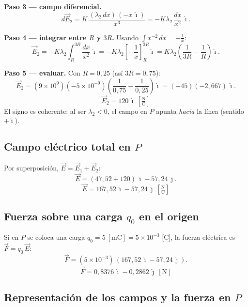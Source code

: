 \documentclass[12pt,letterpaper]{article}
\newcommand{\ii}{\hat{\imath}}
\newcommand{\jj}{\hat{\jmath}}
\begin{document}
\noindent\textbf{Paso 3 — campo diferencial.}
\[
    d\vec{E}_2 = K\,\frac{(\lambda_2\,dx)\,(-x\,\ii)}{x^{3}}
    = -K\lambda_2\,\frac{dx}{x^{2}}\,\ii.
\]

\noindent\textbf{Paso 4 — integrar entre $R$ y $3R$.} Usando $\displaystyle\int x^{-2}\,dx = -\frac{1}{x}$:
\[
    \vec{E}_2 = -K\lambda_2\int_{R}^{3R}\frac{dx}{x^{2}}\,\ii
    = -K\lambda_2\left[-\frac{1}{x}\right]_{R}^{3R}\ii
    = K\lambda_2\left(\frac{1}{3R} - \frac{1}{R}\right)\ii.
\]

\noindent\textbf{Paso 5 — evaluar.} Con $R = 0{,}25$ (as\'i $3R = 0{,}75$):
\[
    \vec{E}_2 = (9\times10^{9})(-5\times10^{-9})\left(\frac{1}{0{,}75} - \frac{1}{0{,}25}\right)\ii
    = (-45)(-2{,}667)\,\ii.
\]
\[
    \boxed{\vec{E}_2 = 120\,\ii\ \left[\tfrac{\text{N}}{\text{C}}\right]}
\]
El signo es coherente: al ser $\lambda_2<0$, el campo en $P$ apunta \emph{hacia} la l\'inea (sentido $+\ii$).

\subsection*{Campo el\'ectrico total en $P$}

Por superposici\'on, $\vec{E} = \vec{E}_1 + \vec{E}_2$:
\[
    \vec{E} = (47{,}52 + 120)\,\ii - 57{,}24\,\jj.
\]
\[
    \boxed{\vec{E} = 167{,}52\,\ii - 57{,}24\,\jj\ \left[\tfrac{\text{N}}{\text{C}}\right]}
\]

\subsection*{Fuerza sobre una carga $q_0$ en el origen}

Si en $P$ se coloca una carga $q_0 = 5\ [\text{mC}] = 5\times10^{-3}$ [C], la fuerza el\'ectrica es
$\vec{F} = q_0\,\vec{E}$:
\[
    \vec{F} = (5\times10^{-3})\,(167{,}52\,\ii - 57{,}24\,\jj).
\]
\[
    \boxed{\vec{F} = 0{,}8376\,\ii - 0{,}2862\,\jj\ [\text{N}]}
\]

\subsection*{Representaci\'on de los campos y la fuerza en $P$}
\end{document}
